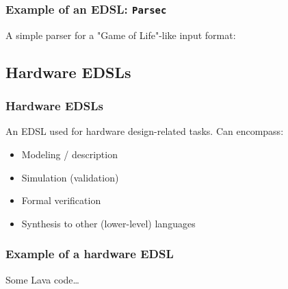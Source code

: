         \begin{frame}[fragile]
            \frametitle{Example of an EDSL: \texttt{Parsec}}

            A simple parser for a "Game of Life"-like input format:
\end{frame}


    \subsection{Hardware EDSLs}
    \label{subsec:hardware-edsls}
        \begin{frame}
            \frametitle{Hardware EDSLs}
            An EDSL used for hardware design-related tasks. Can encompass:

            \begin{itemize}
                \item Modeling / description
                \item Simulation (validation)
                \item Formal verification
                \item Synthesis to other (lower-level) languages
            \end{itemize}
        \end{frame}

        \begin{frame}
            \frametitle{Example of a hardware EDSL}

            Some Lava code\ldots
        \end{frame}
